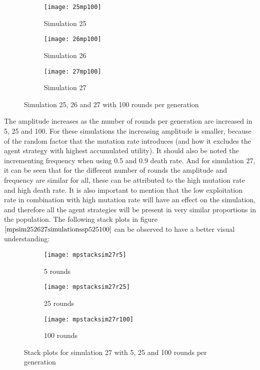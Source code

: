 \begin{figure}[H]       
    \centering
    \begin{subfigure}[b]{0.3\textwidth}
	\centering
	{\texttt{[image: 25mp100]}}   
    	\caption{Simulation 25}
	\label{fig:mpsim25100}
    \end{subfigure}
    \hfill
    \begin{subfigure}[b]{0.3\textwidth}
	\centering
	{\texttt{[image: 26mp100]}}   
    	\caption{Simulation 26}
	\label{fig:mpsim26100}
    \end{subfigure}
    \hfill
    \begin{subfigure}[b]{0.3\textwidth}
	\centering
	{\texttt{[image: 27mp100]}}   
    	\caption{Simulation 27}
	\label{fig:mpsim27100}
    \end{subfigure}
    \caption{Simulation 25, 26 and 27 with 100 rounds per generation}
    \label{mpsim252627simulations100}
\end{figure}

The amplitude increases as the number of rounds per generation are increased in 5, 25 and 100. For these simulations the increasing amplitude is smaller, because of the random factor that the mutation rate introduces (and how it excludes the agent strategy with highest accumulated utility). It should also be noted the incrementing frequency when using 0.5 and 0.9 death rate. And for simulation 27, it can be seen that for the different number of rounds the amplitude and frequency are similar for all, these  can be attributed to the high mutation rate and high death rate. It is also important to mention that the low exploitation rate in combination with high mutation rate will have an effect on the simulation, and therefore all the agent strategies will be present in very similar proportions in the population. The following stack plots in figure $\ref{mpsim252627simulationssp525100}$  can be observed to have a better visual understanding:  

\begin{figure}[H]       
    \centering
    \begin{subfigure}[b]{0.3\textwidth}
	\centering
	{\texttt{[image: mpstacksim27r5]}}   
    	\caption{5 rounds}
	\label{fig:mpsim27sr5}
    \end{subfigure}
    \hfill
    \begin{subfigure}[b]{0.3\textwidth}
	\centering
	{\texttt{[image: mpstacksim27r25]}}   
    	\caption{25 rounds}
	\label{fig:mpsim27sr25}
    \end{subfigure}
    \hfill
    \begin{subfigure}[b]{0.3\textwidth}
	\centering
	{\texttt{[image: mpstacksim27r100]}}   
    	\caption{100 rounds}
	\label{fig:mpsim27sr100}
    \end{subfigure}
    \caption{Stack plots for simulation 27 with 5, 25 and 100 rounds per generation}
    \label{mpsim252627simulationssp525100}
\end{figure}

